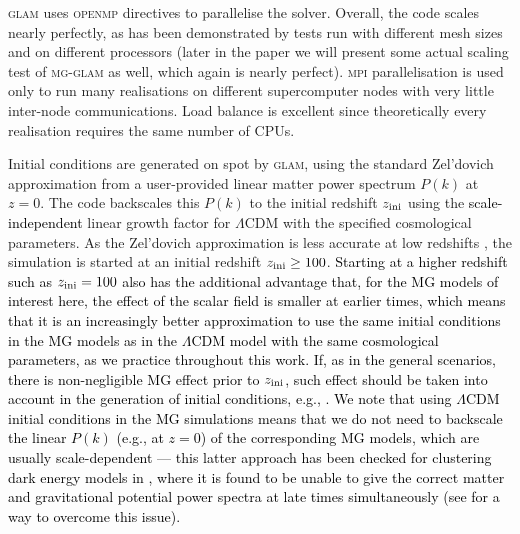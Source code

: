 \textsc{glam} uses \textsc{openmp} directives to parallelise the solver. %
Overall, the code scales nearly perfectly, as has been demonstrated by tests run with different mesh sizes and on different processors (later in the paper we will present some actual scaling test of \textsc{mg-glam} as well, which again is nearly perfect). \textsc{mpi} parallelisation is used only to run many realisations on different supercomputer nodes with very little inter-node communications. Load balance is excellent since theoretically every realisation requires the same number of CPUs. 

Initial conditions are generated on spot by \textsc{glam}, using the standard Zel'dovich approximation \cite{Zeldovich:1970A&A.....5...84Z,Efstathiou:1985ApJS...57..241E} from a user-provided linear matter power spectrum $P(k)$ at $z=0$. The code backscales this $P(k)$ to the initial redshift $z_{\rm ini}$ using the \textcolor{black}{scale-independent} linear growth factor for $\Lambda$CDM with the specified cosmological parameters. As the Zel'dovich approximation is less accurate at low redshifts \cite{Crocce:2006ve}, the simulation is started at an initial redshift $z_{\rm ini}\geq100$. \textcolor{black}{Starting at a higher redshift such as $z_{\rm ini}=100$ also has the additional advantage that, for the MG models of interest here, the effect of the scalar field is smaller at earlier times, which means that it is an increasingly better approximation to use the same initial conditions in the MG models as in the $\Lambda$CDM model with the same cosmological parameters, as we practice throughout this work. If, as in the general scenarios, there is non-negligible MG effect prior to $z_{\rm ini}$, such effect should be taken into account in the generation of initial conditions, e.g., \citep{Li:2011PhRvD..83b4007L}. We note that using $\Lambda$CDM initial conditions in the MG simulations means that we do not need to backscale the linear $P(k)$ (e.g., at $z=0$) of the corresponding MG models, which are usually scale-dependent --- this latter approach has been checked for clustering dark energy models in \citep{Hassani:2019JCAP...12..011H}, where it is found to be unable to give the correct matter and gravitational potential power spectra at late times simultaneously (see \citep{Hassani:2019wed} for a way to overcome this issue).}

